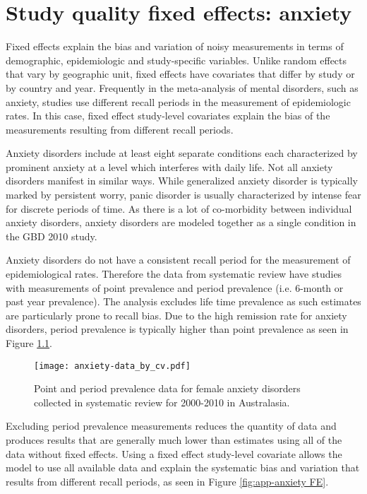 \chapter{Study quality fixed effects: anxiety}
\label{applications-efx_study_level}

Fixed effects explain the bias and variation of noisy measurements in
terms of demographic, epidemiologic and study-specific variables.
Unlike random effects that vary by geographic unit, fixed effects have
covariates that differ by study or by country and year.  Frequently in
the meta-analysis of mental disorders, such as anxiety, studies use
different recall periods in the measurement of epidemiologic rates.
In this case, fixed effect study-level covariates explain the bias of
the measurements resulting from different recall periods.

Anxiety disorders include at least eight separate conditions each
characterized by prominent anxiety at a level which interferes with
daily life.  Not all anxiety disorders manifest in similar ways.
While generalized anxiety disorder is typically marked by persistent
worry, panic disorder is usually characterized by intense fear for
discrete periods of time. \cite{american_diagnostic_2000} As there is
a lot of co-morbidity between individual anxiety disorders, anxiety
disorders are modeled together as a single condition in the GBD 2010
study.

Anxiety disorders do not have a consistent recall period for the
measurement of epidemiological rates.  Therefore the data from
systematic review have studies with measurements of point prevalence
and period prevalence (i.e. 6-month or past year prevalence).  The
analysis excludes life time prevalence as such estimates are
particularly prone to recall bias.  Due to the high remission rate for
anxiety disorders, period prevalence is typically higher than point
prevalence as seen in Figure \ref{fig:app-anxiety data}.

    \begin{figure}[h]
        \begin{center}
            \texttt{[image: anxiety-data\_by\_cv.pdf]}
            \caption{Point and period prevalence data for female
              anxiety disorders collected in systematic review for
              2000-2010 in Australasia.}
            \label{fig:app-anxiety data}
        \end{center}
    \end{figure}

Excluding period prevalence measurements reduces the quantity of data
and produces results that are generally much lower than estimates
using all of the data without fixed effects.  Using a fixed effect
study-level covariate allows the model to use all available data and
explain the systematic bias and variation that results from different
recall periods, as seen in Figure \ref{fig:app-anxiety FE}.

